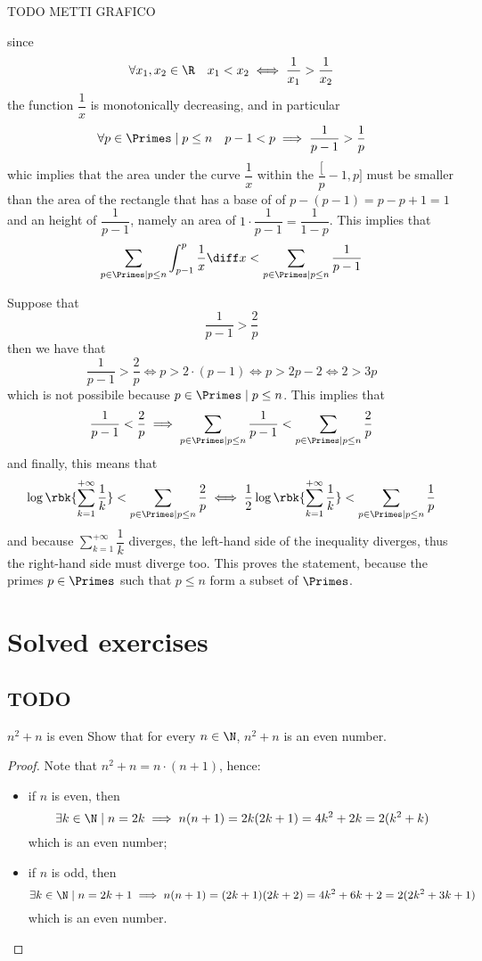 \documentclass[a4paper, 12pt]{report}
\begin{document}
    TODO METTI GRAFICO

    since $$\forall x_1, x_2 \in \R \quad x_1 < x_2 \iff \dfrac{1}{x_1} > \dfrac{1}{x_2}$$ the function $\dfrac{1}{x}$ is monotonically decreasing, and in particular $$\forall p \in \Primes \mid p \le n \quad p -1 < p \implies \dfrac{1}{p - 1} > \dfrac{1}{p}$$ whic implies that the area under the curve $\dfrac{1}{x}$ within the $\dfrac[p-1, p]$ must be smaller than the area of the rectangle that has a base of of $p - (p - 1) = p - p + 1 = 1$ and an height of $\dfrac{1}{p - 1}$, namely an area of $1 \cdot \dfrac{1}{p - 1} = \dfrac{1}{1 - p}$. This implies that $$\sum_{p \in \Primes \mid p \le n}{\int_{p - 1}^p{\dfrac{1}{x} \diff x}} < \sum_{p \in \Primes \mid p \le n}{\dfrac{1}{p - 1}}$$

    Suppose that $$\dfrac{1}{p -1} > \dfrac{2}{p}$$ then we have that $$\dfrac{1}{p -1} > \dfrac{2}{p} \iff p > 2 \cdot (p - 1) \iff p > 2p - 2 \iff 2 > 3p$$ which is not possibile because $p \in \Primes \mid p \le n$. This implies that $$\dfrac{1}{p - 1} < \dfrac{2}{p} \implies \sum_{p \in \Primes \mid p \le n}{\dfrac{1}{p - 1}} <\sum_{p \in \Primes \mid p \le n}{\dfrac{2}{p}}$$ and finally, this means that $$\log \rbk{\sum_{k = 1}^{+ \infty}{\dfrac{1}{k}}} < \sum_{p \in \Primes \mid p \le n}{\dfrac{2}{p}} \iff \dfrac{1}{2} \log \rbk{\sum_{k = 1}^{+ \infty}{\dfrac{1}{k}}} < \sum_{p \in \Primes \mid p \le n}{\dfrac{1}{p}}$$ and because $\displaystyle \sum_{k =1}^{+ \infty}{\dfrac{1}{k}}$ diverges, the left-hand side of the inequality diverges, thus the right-hand side must diverge too. This proves the statement, because the primes $p \in \Primes$ such that $p \le n$ form a subset of $\Primes$.


    \section{Solved exercises}

    \subsection{TODO}

    \begin{framedprob}{$n^2 + n$ is even}
        Show that for every $n \in \N$, $n^2 + n$ is an even number.
    \end{framedprob}

    \begin{proof}
        Note that $n^2 + n = n \cdot (n + 1)$, hence:

        \begin{itemize}
            \item if $n$ is even, then $$\exists k \in \N \mid n = 2k \implies n(n + 1) = 2k(2k + 1) =4k^2 + 2k = 2(k^2+k)$$ which is an even number;
            \item if $n$ is odd, then $$\exists k \in \N \mid n = 2k + 1 \implies n(n + 1) = (2k + 1)(2k + 2) = 4k^2 + 6k + 2 = 2(2k^2 + 3k +1)$$ which is an even number.
        \end{itemize}
    \end{proof}
\end{document}

